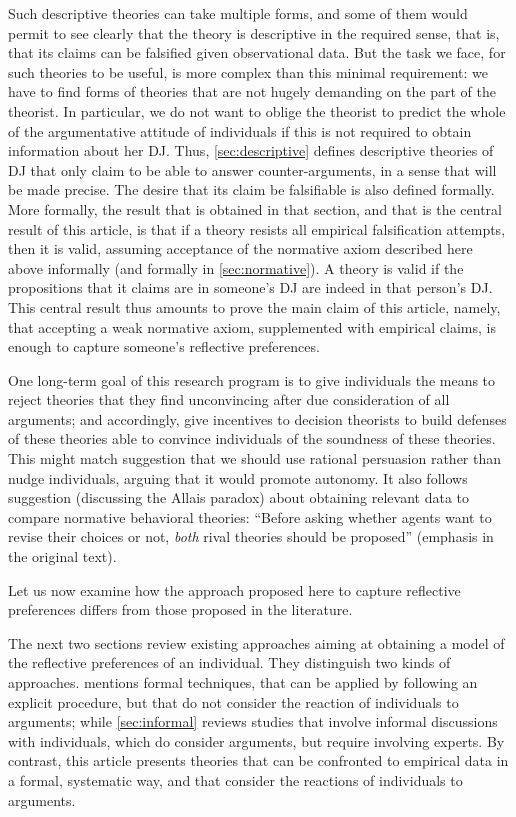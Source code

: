 \documentclass[version=last, pagesize, twoside=off, bibliography=totoc, DIV=calc, fontsize=12pt, a4paper, french, english]{scrartcl}
\begin{document}
Such descriptive theories can take multiple forms, and some of them would permit to see clearly that the theory is descriptive in the required sense, that is, that its claims can be falsified given observational data. 
But the task we face, for such theories to be useful, is more complex than this minimal requirement: we have to find forms of theories that are not hugely demanding on the part of the theorist. In particular, we do not want to oblige the theorist to predict the whole of the argumentative attitude of individuals if this is not required to obtain information about her \ac{DJ}. Thus, \cref{sec:descriptive} defines descriptive theories of \ac{DJ} that only claim to be able to answer counter-arguments, in a sense that will be made precise. The desire that its claim be falsifiable is also defined formally. More formally, the result that is obtained in that section, and that is the central result of this article, is that if a theory resists all empirical falsification attempts, then it is valid, assuming acceptance of the normative axiom described here above informally (and formally in \cref{sec:normative}). A theory is valid if the propositions that it claims are in someone’s \ac{DJ} are indeed in that person’s \ac{DJ}. This central result thus amounts to prove the main claim of this article, namely, that accepting a weak normative axiom, supplemented with empirical claims, is enough to capture someone’s reflective preferences.

One long-term goal of this research program is to give individuals the means to reject theories that they find unconvincing after due consideration of all arguments; and accordingly, give incentives to decision theorists to build defenses of these theories able to convince individuals of the soundness of these theories. This might match  suggestion that we should use rational persuasion rather than nudge individuals, arguing that it would promote autonomy.
It also follows  suggestion (discussing the Allais paradox) about obtaining relevant data to compare normative behavioral theories: “Before asking whether agents want to revise their choices or not, \emph{both} rival theories should be proposed” (emphasis in the original text).

Let us now examine how the approach proposed here to capture reflective preferences differs from those proposed in the literature.

The next two sections review existing approaches aiming at obtaining a model of the reflective preferences of an individual. They distinguish two kinds of approaches.  mentions formal techniques, that can be applied by following an explicit procedure, but that do not consider the reaction of individuals to arguments; while \cref{sec:informal} reviews studies that involve informal discussions with individuals, which do consider arguments, but require involving experts. By contrast, this article presents theories that can be confronted to empirical data in a formal, systematic way, and that consider the reactions of individuals to arguments.
\end{document}

